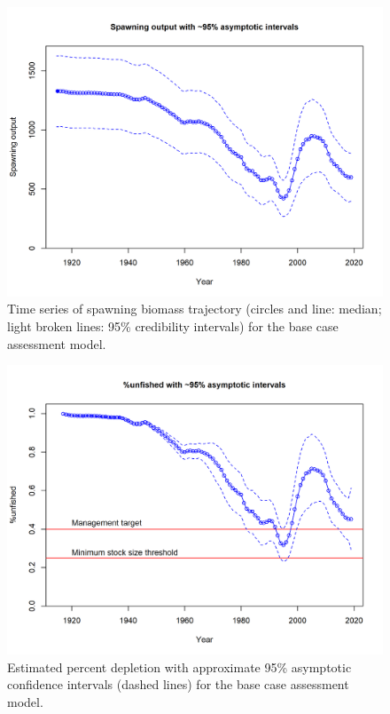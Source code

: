 \documentclass[12pt,]{article}
\begin{document}
\FloatBarrier

\begin{figure}
\centering
\includegraphics{r4ss/plots_mod1/ts7_Spawning_output_with_95_asymptotic_intervals_intervals.png}
\caption{Time series of spawning biomass trajectory (circles and line:
median; light broken lines: 95\% credibility intervals) for the base
case assessment model. \label{fig:Spawnbio_all}}
\end{figure}

\begin{figure}
\centering
\includegraphics{r4ss/plots_mod1/ts9_unfished_with_95_asymptotic_intervals_intervals.png}
\caption{Estimated percent depletion with approximate 95\% asymptotic
confidence intervals (dashed lines) for the base case assessment model.
\label{fig:RelDeplete_all}}
\end{figure}
\end{document}
